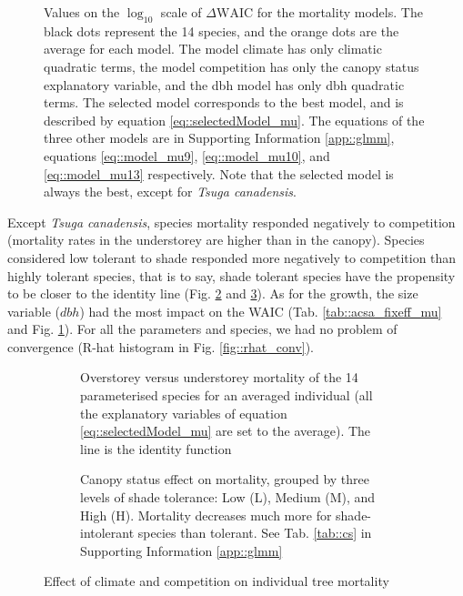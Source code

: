\begin{figure}
	\centering
	
	\caption{Values on the $ \log_{10} $ scale of $ \Delta \text{WAIC} $ for the mortality models. The black dots represent the 14 species, and the orange dots are the average for each model. The model climate has only climatic quadratic terms, the model competition has only the canopy status explanatory variable, and the dbh model has only dbh quadratic terms. The selected model corresponds to the best model, and is described by equation \eqref{eq::selectedModel_mu}. The equations of the three other models are in Supporting Information \ref{app::glmm}, equations \eqref{eq::model_mu9}, \eqref{eq::model_mu10}, and \eqref{eq::model_mu13} respectively. Note that the selected model is always the best, except for \textit{Tsuga canadensis}. \label{fig::delta_waic}}
\end{figure}

Except \textit{Tsuga canadensis}, species mortality responded negatively to
competition (\ie mortality rates in the understorey are higher than in the
canopy). Species considered low tolerant to shade responded more negatively to
competition than highly tolerant species, that is to say, shade tolerant species
have the propensity to be closer to the identity line (Fig.
\ref{fig::over_under_mu} and \ref{fig::groups_mu}). As for the growth, the
size variable ($ dbh $) had the most impact on the WAIC (Tab.
\ref{tab::acsa_fixeff_mu} and Fig. \ref{fig::delta_waic}). For all the parameters and species, we had no problem of convergence (R-hat histogram in Fig. \ref{fig::rhat_conv}).

\begin{figure}
\begin{subfigure}[t]{.48\textwidth}
	\centering
	
	\caption{Overstorey versus understorey mortality of the 14 parameterised species for an averaged individual (\ie all the explanatory variables of equation \eqref{eq::selectedModel_mu} are set to the average). The line is the identity function}
	\label{fig::over_under_mu}
\end{subfigure}
\hfill
\begin{subfigure}[t]{.48\textwidth}
	\centering
	
	\caption{Canopy status effect on mortality, grouped by three levels of shade tolerance: Low (L), Medium (M), and High (H). Mortality decreases much more for shade-intolerant species than tolerant. See Tab. \ref{tab::cs} in Supporting Information \ref{app::glmm}}
	\label{fig::groups_mu}
\end{subfigure}
\caption{Effect of climate and competition on individual tree mortality}
\label{fig::mortalityResults}
\end{figure}

